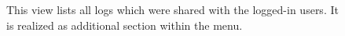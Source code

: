 \documentclass[../main.tex]{subfiles}
\begin{document}
\begin{figure}[h!]
    \centering
    \caption{
        This view lists all logs which were shared with the logged-in users.
        It is realized as additional section within the menu.
    }
    \label{app:clotilde-shared}
\end{figure}
\end{document}

